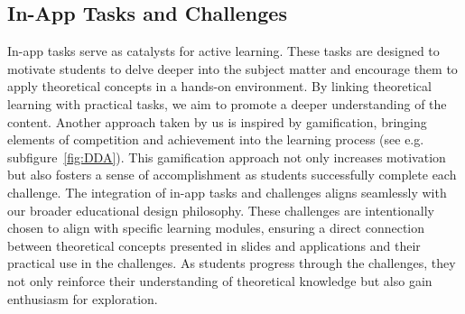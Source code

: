 \subsection{In-App Tasks and Challenges}
In-app tasks serve as catalysts for active learning. These tasks are designed to motivate students to delve deeper into the subject matter and encourage them to apply theoretical concepts in a hands-on environment. By linking theoretical learning with practical tasks, we aim to promote a deeper understanding of the content. Another approach taken by us is inspired by gamification, bringing elements of competition and achievement into the learning process (see e.g. subfigure~\ref{fig:DDA}).
This gamification approach not only increases motivation but also fosters a sense of accomplishment as students successfully complete each challenge. The integration of in-app tasks and challenges aligns seamlessly with our broader educational design philosophy. These challenges are intentionally chosen to align with specific learning modules, ensuring a direct connection between theoretical concepts presented in slides and applications and their practical use in the challenges. As students progress through the challenges, they not only reinforce their understanding of theoretical knowledge but also gain enthusiasm for exploration.

